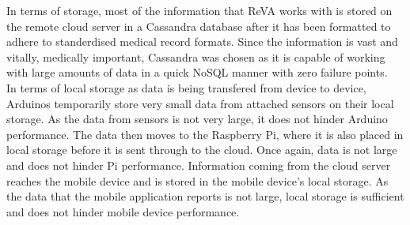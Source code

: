 In terms of storage, most of the information that ReVA works with is stored on the remote cloud server in a Cassandra database after it
has been formatted to adhere to standerdised medical record formats. Since the information is vast and vitally, medically important, Cassandra
was chosen as it is capable of working with large amounts of data in a quick NoSQL manner with zero failure points.\\In terms of local storage
as data is being transfered from device to device, Arduinos temporarily store very small data from attached sensors on their local storage. As
the data from sensors is not very large, it does not hinder Arduino performance. The data then moves to the Raspberry Pi, where it is also placed 
in local storage before it is sent through to the cloud. Once again, data is not large and does not hinder Pi performance. Information coming from the 
cloud server reaches the mobile device and is stored in the mobile device's local storage. As the data that the mobile application reports is not 
large, local storage is sufficient and does not hinder mobile device performance. 
